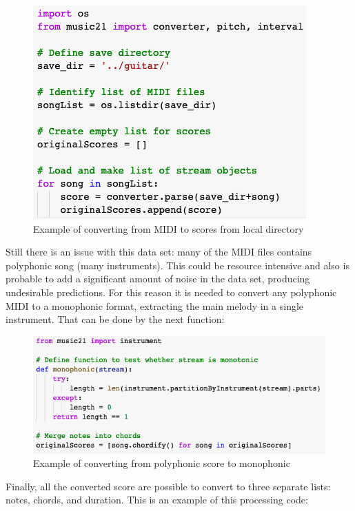 \begin{figure}[h!]
  \includegraphics[width=\linewidth]{image/fig_JDF17.png}
  \caption{Example of converting from MIDI to scores from local directory }
\end{figure}


Still there is an issue with this data set: many of the MIDI files contains polyphonic
song (many instruments). This could be resource intensive and also is probable to add a
significant amount of noise in the data set, producing undesirable predictions. For this
reason it is needed to convert any polyphonic MIDI to a monophonic format, extracting the
main melody in a single instrument. That can be done by the next function:

\begin{figure}[h!]
  \includegraphics[width=\linewidth]{image/fig_JDF18.png}
  \caption{Example of converting from polyphonic score to monophonic }
\end{figure}


Finally, all the converted score are possible to convert to three separate lists: notes,
chords, and duration. This is an example of this processing code:

